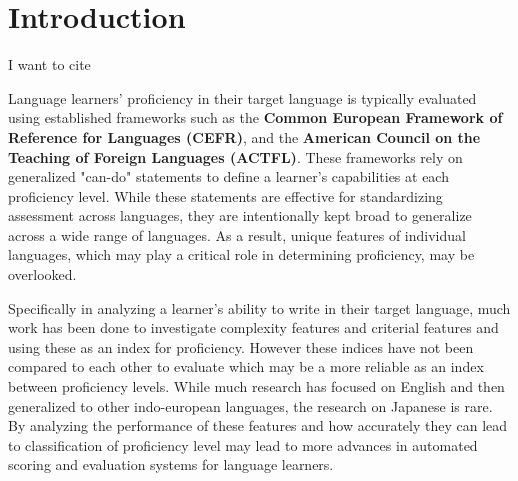 \chapter{Introduction}






 I want to cite \citet{Skehan1989}
 \citet{Alexpoulou2017}
 \citet{Bardovi-Harlig1992}


Language learners' proficiency in their target language is typically evaluated using established frameworks such as the \textbf{Common European Framework of Reference for Languages (CEFR)}, and the \textbf{American Council on the Teaching of Foreign Languages (ACTFL)}. These frameworks rely on generalized "can-do" statements to define a learner's capabilities at each proficiency level. While these statements are effective for standardizing assessment across languages, they are intentionally kept broad to generalize across a wide range of languages. As a result, unique features of individual languages, which may play a critical role in determining proficiency, may be overlooked.

Specifically in analyzing a learner's ability to write in their target language, much work has been done to investigate complexity features and criterial features and using these as an index for proficiency. However these indices have not been compared to each other to evaluate which may be a more reliable as an index between proficiency levels. While much research has focused on English and then generalized to other indo-european languages, the research on Japanese is rare. By analyzing the performance of these features and how accurately they can lead to classification of proficiency level may lead to more advances in automated scoring and evaluation systems for language learners. 

